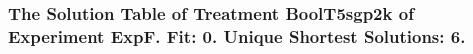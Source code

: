  \begin{frame}
 \fontsize{8pt}{9pt}\selectfont
 \frametitle{ The Solution Table of Treatment BoolT5sgp2k of Experiment ExpF. Fit: 0. Unique Shortest Solutions: 6. }

 \label{ExpFSolutionTable003.tex}  
 \end{frame}

